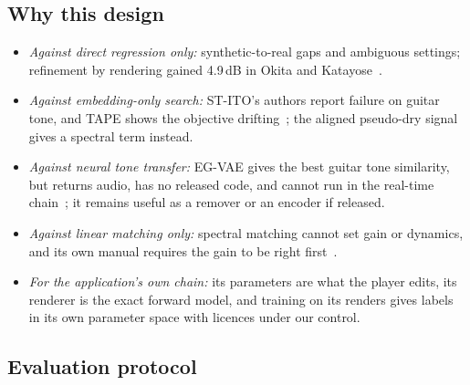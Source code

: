 \subsection{Why this design}

\begin{itemize}
\item \emph{Against direct regression only:} synthetic-to-real gaps and
ambiguous settings; refinement by rendering gained 4.9\,dB in Okita and
Katayose~\cite{okita2026audio}.
\item \emph{Against embedding-only search:} ST-ITO's authors report failure on
guitar tone, and TAPE shows the objective drifting~\cite{steinmetz2024stito,long2026tape};
the aligned pseudo-dry signal gives a spectral term instead.
\item \emph{Against neural tone transfer:} EG-VAE gives the best guitar tone
similarity, but returns audio, has no released code, and cannot run in the
real-time chain~\cite{yeh2026egvae}; it remains useful as a remover or an
encoder if released.
\item \emph{Against linear matching only:} spectral matching cannot set gain or
dynamics, and its own manual requires the gain to be right
first~\cite{fractalndtonematch}.
\item \emph{For the application's own chain:} its parameters are what the
player edits, its renderer is the exact forward model, and training on its
renders gives labels in its own parameter space with licences under our
control.
\end{itemize}

\subsection{Evaluation protocol}
\label{sec:protocol}

